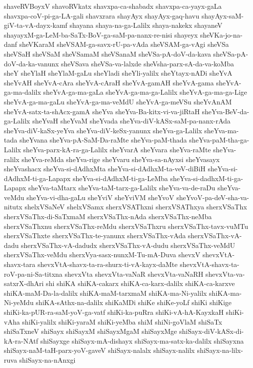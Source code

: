 {shaveRVBoyxV
shavoRVkatx
shavxpa-ca-shabadx
shavxpa-ca-yayx-gaLa
shavxpa-coV-pi-ga-LA-gali
shavxrara
shayAyx
shayAyx-gaq-havu
shayAyx-saM-giV-ta-vA-dayx-kamf
shayana
shaya-na-ga-Lalilx
shaya-nakekx
shayaneV
shayayxM-ga-LeM-ba-SaTx-BoV-ga-saM-pa-nanx-re-nisi
shayeyx
sheVKa-jo-na-danf
sheVKaraM
sheVSAM-ga-savx-rU-pa-vAda
sheVSAM-ga-vAgi
sheVSa
sheVSaH
sheVSaM
sheVSamaM
sheVSanaM
sheVSa-pA-doV-da-kava
sheVSa-pA-doV-da-ka-vanunx
sheVSava
sheVSa-va-lalxde
sheVsha-parx-sA-da-va-koMba
sheY
sheYlaH
sheYlaM-gaLu
sheYladi
sheYli-yalilx
sheYtayx-nADi
sheYvA
sheYvAH
sheYvA-cAra
sheYvA-cAraH
sheYvA-gamAH
sheYvA-gama
sheYvA-ga-ma-dalilx
sheYvA-ga-ma-gaLa
sheYvA-ga-ma-ga-Lalilx
sheYvA-ga-ma-ga-Lige
sheYvA-ga-ma-gaLu
sheYvA-ga-ma-veMdU
sheYvA-ga-meVSu
sheYvAnAM
sheYvA-satx-ta-shAcx-gamA
sheYva
sheYva-Ba-kitx-vi-va-jiRtaH
sheYva-BeV-da-ga-Lalilx
sheYvaH
sheYvaM
sheYvada
sheYva-diV-kASx-saM-pa-nanx-rAda
sheYva-diV-kaSx-yeYva
sheYva-diV-keSx-yanunx
sheYva-ga-Lalilx
sheYva-ma-tada
sheYvana
sheYva-pA-SaM-Da-raMte
sheYva-paM-thada
sheYva-paM-tha-ga-Lalilx
sheYva-parx-kA-ra-ga-Lalilx
sheYvarA
sheYvara
sheYva-raMte
sheYva-ralilx
sheYva-reMda
sheYva-rige
sheYvaru
sheYva-sa-nAyxsi
sheYvasayx
sheYvashacx
sheYva-si-dAdhxMta
sheYva-si-dAdhxM-ta-veV-diBiH
sheYva-si-dAdhxM-ti-ga-Lapapx
sheYva-si-dAdhxM-ti-ga-LeMba
sheYva-si-dadhxM-ti-ga-Lapapx
sheYva-taMtarx
sheYva-taM-tarx-ga-Lalilx
sheYva-va-de-raDu
sheYva-veMdu
sheYva-vi-dha-gaLu
sheYviV
sheYviVM
sheYvoV
sheYvoV-pa-deV-sha-va-nitutx
shelxVSaNeV
shelxVSamx
sherxVSAThxni
sherxVSAThxya
sherxVSaThx
sherxVSaThx-di-SaTxmaM
sherxVSaThx-nAda
sherxVSaThx-neMba
sherxVSaThxnu
sherxVSaThx-reMdu
sherxVSaThxru
sherxVSaThx-tavx-vuMTu
sherxVSaThxte
sherxVSaThx-te-yanunx
sherxVSaThx-vAda
sherxVSaThx-vA-dadu
sherxVSaThx-vA-dadudx
sherxVSaThx-vA-dudu
sherxVSaThx-veMdU
sherxVSaThx-veMdu
sherxVya-sasx-nunxM-Tu-mA-Duva
shevxV
shevxVtA-shavx-tara
shevxVtA-shavx-ta-ra-shurx-ti-vA-kayx-daMte
shevxVtA-shavx-ta-roV-pa-ni-Sa-titxna
shevxVta
shevxVta-vaNaR
shevxVta-vaNaRH
shevxVta-va-satxrX-dhAri
shi
shiKA
shiKA-cakarx
shiKA-ca-karx-dalilx
shiKA-ca-karxve
shiKA-maM-Da-la-dalilx
shiKA-maM-tarxmaM
shiKA-ma-Ni-yalilx
shiKA-ma-Ni-yeMdu
shiKA-sAthx-na-dalilx
shiKaMDi
shiKe
shiKe-yoLf
shiKi
shiKige
shiKi-ka-pUR-ra-saM-yoV-ga-vatf
shiKi-ka-puRra
shiKi-vA-hA-KayxkaH
shiKi-vAha
shiKi-yalilx
shiKi-yaraM
shiKi-yeMba
shiM
shiNi-goVlaM
shiSaTx
shiSaTxneV
shiSayx
shiSayxM
shiSayxMgaM
shiSayxMge
shiSayx-diV-kASx-di-kA-ra-NAtf
shiSayxge
shiSayx-mA-dishayx
shiSayx-ma-satx-ka-dalilx
shiSayxna
shiSayx-naM-taH-parx-yoV-gaveV
shiSayx-nalalx
shiSayx-nalilx
shiSayx-na-lilx-ruva
shiSayx-na-nAnxgi
}

